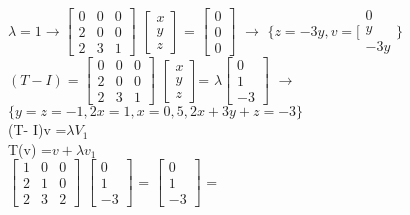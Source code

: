 \documentclass[a4paper,12pt]{report}
\begin{document}
$\lambda = 1 \rightarrow \left [\begin{array}{rrr}
0&0&0\\
2&0&0\\
2&3&1
\end{array}\right]  $
$\left [\begin{array}{rrr} x\\ y\\ z \end{array}\right]$ = 
$\left [\begin{array}{rrr} 0\\ 0\\ 0 \end{array}\right]$
$  \rightarrow $
$\lbrace z= - 3y, v =  [ \begin{array}{rrr} 0\\ y\\ -3y \end{array}\rbrace$ \\

$(T- I) = \left [\begin{array}{rrr}
0&0&0\\
2&0&0\\
2&3&1
\end{array}\right] $
$\left [\begin{array}{rrr} x\\ y\\ z \end{array}\right] $=
$ \lambda \left [\begin{array}{rrr} 0\\ 1\\-3 \end{array}\right]$
$ \rightarrow $
$\lbrace y = z = -1, 2x = 1, x = 0,5, 2x+3y+z = -3 \rbrace$\\

(T- I)v =$\lambda V_1$ \\

T(v) =$ v + \lambda v_1$ \\

$\left [\begin{array}{rrr} 1&0&0\\ 2&1&0\\ 2&3&2 \end{array}\right]$
$\left [\begin{array}{rrr} 0\\1\\ -3 \end{array}\right]$ = 
$\left [\begin{array}{rrr}
0\\
1\\
-3
\end{array}\right]$ =
\end{document}
